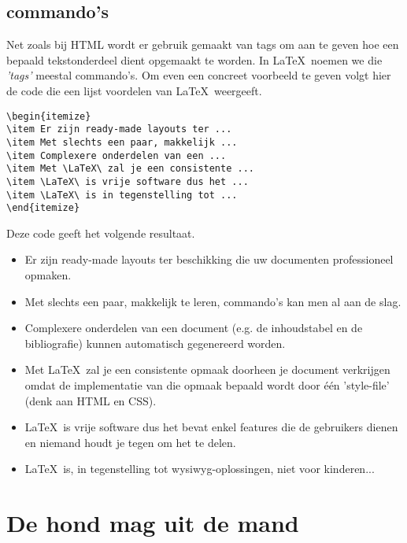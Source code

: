 \documentclass[paper=a4, fontsize=12pt, onecolumn]{scrartcl}
\begin{document}
\subsection*{commando's}

Net zoals bij HTML wordt er gebruik gemaakt van tags om aan te geven hoe een bepaald tekstonderdeel dient opgemaakt te worden. In \LaTeX\ noemen we die \textit{'tags'} meestal commando's. Om even een concreet voorbeeld te geven volgt hier de code die een lijst voordelen van \LaTeX\ weergeeft. 

\begin{verbatim}
\begin{itemize}
\item Er zijn ready-made layouts ter ...
\item Met slechts een paar, makkelijk ...
\item Complexere onderdelen van een ...
\item Met \LaTeX\ zal je een consistente ...
\item \LaTeX\ is vrije software dus het ...
\item \LaTeX\ is in tegenstelling tot ...
\end{itemize}
\end{verbatim}

Deze code geeft het volgende resultaat.

\begin{itemize}
\item Er zijn ready-made layouts ter beschikking die uw documenten professioneel opmaken. 
\item Met slechts een paar, makkelijk te leren, commando's kan men al aan de slag.
\item Complexere onderdelen van een document (e.g. de inhoudstabel en de bibliografie) kunnen automatisch gegenereerd worden.
\item Met \LaTeX\ zal je een consistente opmaak doorheen je document verkrijgen omdat de implementatie van die opmaak bepaald wordt door \'e\'en 'style-file' (denk aan HTML en CSS). 
\item \LaTeX\ is vrije software dus het bevat enkel features die de gebruikers dienen en niemand houdt je tegen om het te delen.
\item \LaTeX\ is, in tegenstelling tot wysiwyg-oplossingen, niet voor kinderen...
\end{itemize}

\section*{De hond mag uit de mand}
\end{document}
